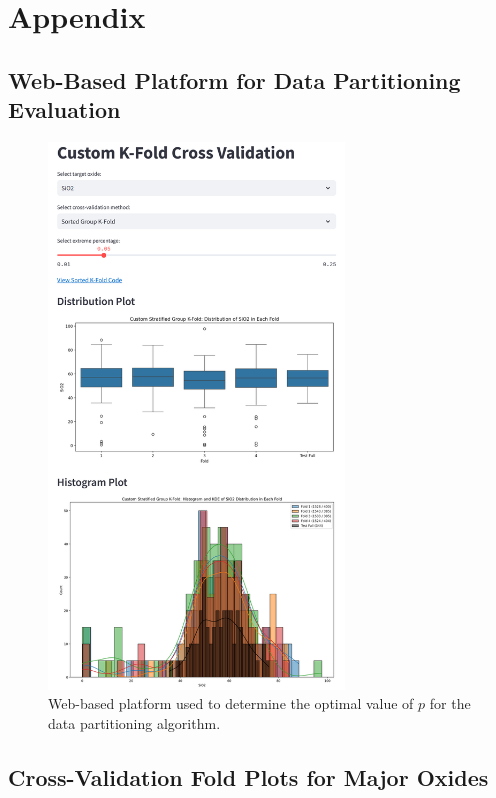 \section*{Appendix}

\subsection{Web-Based Platform for Data Partitioning Evaluation}\label{subsec:web_platform}

\begin{figure}
    \centering
    \includegraphics[width=0.7\textwidth]{images/web_platform.png}
    \caption{Web-based platform used to determine the optimal value of $p$ for the data partitioning algorithm.}
    \label{fig:web_platform}
\end{figure}

\subsection{Cross-Validation Fold Plots for Major Oxides}\label{subsec:cv_plots}

